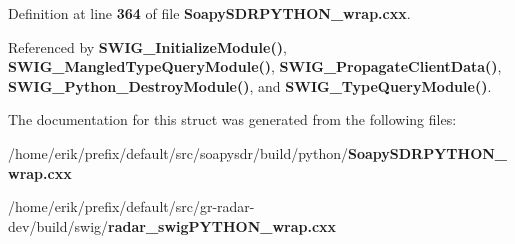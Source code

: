 Definition at line {\bf 364} of file {\bf Soapy\+S\+D\+R\+P\+Y\+T\+H\+O\+N\+\_\+wrap.\+cxx}.



Referenced by {\bf S\+W\+I\+G\+\_\+\+Initialize\+Module()}, {\bf S\+W\+I\+G\+\_\+\+Mangled\+Type\+Query\+Module()}, {\bf S\+W\+I\+G\+\_\+\+Propagate\+Client\+Data()}, {\bf S\+W\+I\+G\+\_\+\+Python\+\_\+\+Destroy\+Module()}, and {\bf S\+W\+I\+G\+\_\+\+Type\+Query\+Module()}.



The documentation for this struct was generated from the following files\+:\begin{DoxyCompactItemize}
\item 
/home/erik/prefix/default/src/soapysdr/build/python/{\bf Soapy\+S\+D\+R\+P\+Y\+T\+H\+O\+N\+\_\+wrap.\+cxx}\item 
/home/erik/prefix/default/src/gr-\/radar-\/dev/build/swig/{\bf radar\+\_\+swig\+P\+Y\+T\+H\+O\+N\+\_\+wrap.\+cxx}\end{DoxyCompactItemize}
